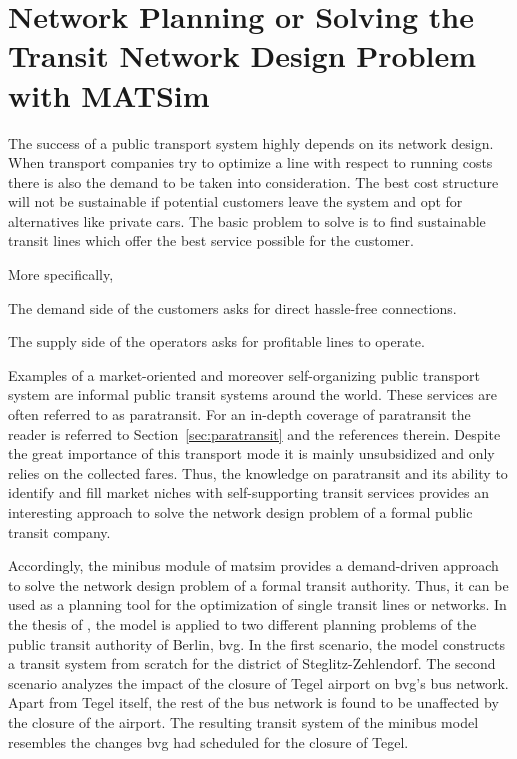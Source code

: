 \section{Network Planning or Solving the Transit Network Design Problem with MATSim}
\label{sec:paratransit_application}
%
The success of a public transport system highly depends on its network design. When transport companies try to optimize a line with respect to running costs there is also the demand to be taken into consideration. The best cost structure will not be sustainable if potential customers leave the system and opt for alternatives like private cars. The basic problem to solve is to find sustainable transit lines which offer the best service possible for the customer.

More specifically,
\begin{compactitem}
\item The demand side of the customers asks for direct hassle-free connections.
\item The supply side of the operators asks for profitable lines to operate.
\end{compactitem}
Examples of a market-oriented and moreover self-organizing public transport system are informal public transit systems around the world. These services are often referred to as paratransit. For an in-depth coverage of paratransit the reader is referred to Section~\ref{sec:paratransit} and the references therein. Despite the great importance of this transport mode it is mainly unsubsidized and only relies on the collected fares. Thus, the knowledge on paratransit and its ability to identify and fill market niches with self-supporting transit services provides an interesting approach to solve the network design problem of a formal public transit company.

\noindent
Accordingly, the minibus module of \gls{matsim} provides a demand-driven approach to solve the network design problem of a formal transit authority. Thus, it can be used as a planning tool for the optimization of single transit lines or networks. In the thesis of \citet[][]{Neumann_PhDThesis_2014}, the model is applied to two different planning problems of the public transit authority of Berlin, \gls{bvg}. In the first scenario, the model constructs a transit system from scratch for the district of Steglitz-Zehlendorf. The second scenario analyzes the impact of the closure of Tegel airport on \gls{bvg}'s bus network. Apart from Tegel itself, the rest of the bus network is found to be unaffected by the closure of the airport. The resulting transit system of the minibus model resembles the changes \gls{bvg} had scheduled for the closure of Tegel.

